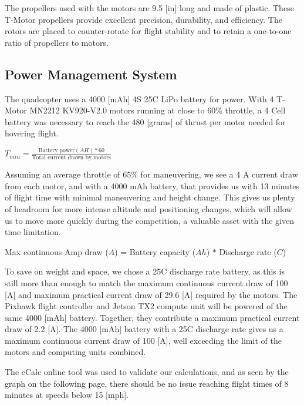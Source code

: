 \documentclass[12pt,letterpaper]{article}
\begin{document}
	The propellers used with the motors are 9.5 [in] long and made of plastic. These T-Motor propellers provide excellent precision, durability, and efficiency. The rotors are placed to counter-rotate for flight stability and to retain a one-to-one ratio of propellers to motors.

	\subsection*{Power Management System}
	The quadcopter uses a 4000 [mAh] 4S 25C LiPo battery for power. With 4 T-Motor MN2212 KV920-V2.0 motors running at close to 60\% throttle, a 4 Cell battery was necessary to reach the 480 [grams] of thrust per motor needed for hovering flight.
	\begin{center}
		$T_{min} = \frac{\text{Battery power}(AH) * 60}{\text{Total current drawn by motors}}$
	\end{center}

	Assuming an average throttle of 65\% for maneuvering, we see a 4 A current draw from each motor, and with a 4000 mAh battery, that provides us with 13 minutes of flight time with minimal maneuvering and height change. This gives us plenty of headroom for more intense altitude and positioning changes, which will allow us to move more quickly during the competition, a valuable asset with the given time limitation.
	\begin{center}
		Max continuous Amp draw ($A$) = Battery capacity ($Ah$) $*$ Discharge rate ($C$)
	\end{center}

	To save on weight and space, we chose a 25C discharge rate battery, as this is still more than enough to match the maximum continuous current draw of 100 [A] and maximum practical current draw of 29.6 [A] required by the motors. The Pixhawk flight controller and Jetson TX2 compute unit will be powered of the same 4000 [mAh] battery. Together, they contribute a maximum practical current draw of 2.2 [A]. The 4000 [mAh] battery with a 25C discharge rate gives us a maximum continuous current draw of 100 [A], well exceeding the limit of the motors and computing units combined.

	The eCalc online tool was used to validate our calculations, and as seen by the graph on the following page, there should be no issue reaching flight times of 8 minutes at speeds below 15 [mph].
\end{document}
